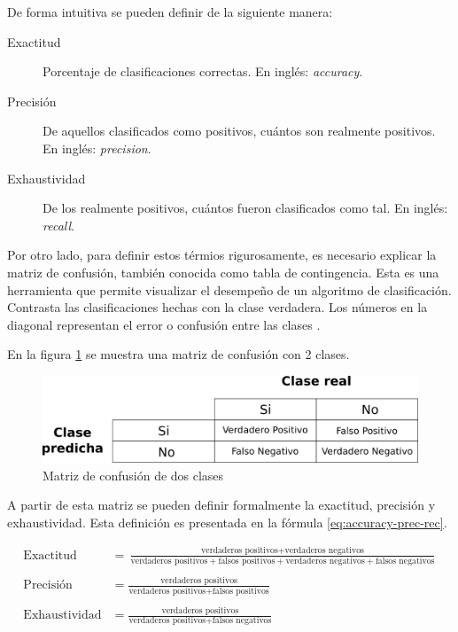De forma intuitiva se pueden definir de la siguiente manera:

\begin{description}
	\item [Exactitud] Porcentaje de clasificaciones correctas. En inglés: \textit{accuracy}.
	\item [Precisión] De aquellos clasificados como positivos, cuántos son realmente positivos. En inglés: \textit{precision}.
	\item [Exhaustividad] De los realmente positivos, cuántos fueron clasificados como tal. En inglés: \textit{recall}.
\end{description}

Por otro lado, para definir estos térmios rigurosamente, es necesario explicar la matriz de confusión, también conocida como tabla de contingencia. Esta es una herramienta que permite visualizar el desempeño de un algoritmo de clasificación. Contrasta las clasificaciones hechas con la clase verdadera. Los números en la diagonal representan el error o confusión entre las clases \citep{fawcett2006introduction}.

En la figura \ref{fig:confussion2} se muestra una matriz de confusión con 2 clases.

\begin{figure}[htbp]
	\centering
	\includegraphics[width=0.6\linewidth]{graficos/propios/matriz_confusion.png}
	\caption{Matriz de confusión de dos clases}
	\label{fig:confussion2}
\end{figure}

A partir de esta matriz se pueden definir formalmente la exactitud, precisión y exhaustividad. Esta definición es presentada en la fórmula \ref{eq:accuracy-prec-rec}.

\begin{equation}
	\label{eq:accuracy-prec-rec}
\begin{split}
	\text{Exactitud} &= \frac{\text{verdaderos positivos} + \text{verdaderos negativos}}{\text{verdaderos positivos} + \text{falsos positivos} + \text{verdaderos negativos} + \text{falsos negativos}} \\\\
	\text{Precisión} &= \frac{\text{verdaderos positivos}}{\text{verdaderos positivos} + \text{falsos positivos}} \\\\
	\text{Exhaustividad} &= \frac{\text{verdaderos positivos}}{\text{verdaderos positivos} + \text{falsos negativos}}
\end{split}
\end{equation}

